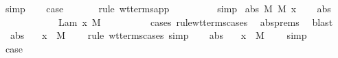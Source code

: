 \begin{isabellebody}
\ simp\isanewline
\ \ \isamarkupfalse%
\ {\isacharquery}case\ \isanewline
\ \ \ \ \isamarkupfalse%
\ {\isacharparenleft}rule\ wt{\isacharunderscore}terms{\isachardot}app{\isacharparenright}\isanewline
\ \ \ \ \isamarkupfalse%
\ {}\ {}\ \isamarkupfalse%
\ simp{\isacharplus}\isanewline
{}\isamarkupfalse%
\isanewline
{}\isamarkupfalse%
\ {\isacharparenleft}abs\ M\ M{\isacharprime}\ x{\isacharparenright}\isanewline
\ \ \isamarkupfalse%
\ abs{\isacharparenleft}{}{\isacharparenright}\ \isamarkupfalse%
\ {\isasympi}\ {\isasymtau}\ \ {}{\isacharcolon}\ {\isachardoublequoteopen}{\isasymsigma}\ {\isacharequal}\ {\isasympi}\ {\isasymrightarrow}\ {\isasymtau}{\isachardoublequoteclose}\ {\isachardoublequoteopen}{\isasymGamma}\ {\isasymturnstile}\ Lam\ {\isacharbrackleft}x{\isacharbrackright}{\isachardot}\ M\ {\isacharcolon}\ {\isasympi}\ {\isasymrightarrow}\ {\isasymtau}{\isachardoublequoteclose}\isanewline
\ \ \ \ \isamarkupfalse%
\ {\isacharparenleft}cases\ rule{\isacharcolon}wt{\isacharunderscore}terms{\isachardot}cases{\isacharparenright}\ \isamarkupfalse%
\ abs{\isachardot}prems\ \isamarkupfalse%
\ blast\isanewline
\ \ \isamarkupfalse%
\ {}{\isacharparenleft}{}{\isacharparenright}\ abs{\isacharparenleft}{}{\isacharparenright}\ \isamarkupfalse%
\ {}{\isacharcolon}\ {\isachardoublequoteopen}{\isacharparenleft}{\isacharparenleft}x{\isacharcomma}{\isasympi}{\isacharparenright}{\isacharhash}{\isasymGamma}{\isacharparenright}\ {\isasymturnstile}\ M\ {\isacharcolon}\ {\isasymtau}{\isachardoublequoteclose}\ \isamarkupfalse%
\ {\isacharparenleft}rule\ wt{\isacharunderscore}terms{\isacharunderscore}cases{\isacharunderscore}{}{\isacharcomma}\ simp{\isacharparenright}\isanewline
\ \ \isamarkupfalse%
\ abs{\isacharparenleft}{}{\isacharparenright}\ \isamarkupfalse%
\ {}{\isacharcolon}\ {\isachardoublequoteopen}{\isacharparenleft}{\isacharparenleft}x{\isacharcomma}{\isasympi}{\isacharparenright}{\isacharhash}{\isasymGamma}{\isacharparenright}\ {\isasymturnstile}\ M{\isacharprime}\ {\isacharcolon}\ {\isasymtau}{\isachardoublequoteclose}\ \isamarkupfalse%
\ simp\isanewline
\ \ \isanewline
\ \ \isamarkupfalse%
\ {\isacharquery}case\isanewline

\end{isabellebody}
